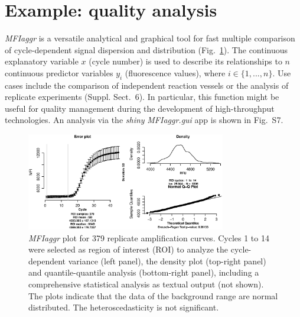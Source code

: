 \documentclass{bioinfo}
\begin{document}
\section{Example: quality analysis}

\textsl{MFIaggr} is a versatile analytical and graphical tool for fast multiple 
comparison of cycle-dependent signal dispersion and distribution 
(Fig.~\ref{fig:01}). The continuous explanatory variable $x$ (cycle number) is 
used to describe its relationships to $n$ continuous predictor variables $y_i$ 
(fluorescence values), where $i \in \{1, ..., n\}$. Use cases include the 
comparison of independent reaction vessels or the analysis of replicate 
experiments (Suppl. Sect.~6). In particular, this function might be useful for 
quality management during the development of high-throughput technologies. An 
analysis via the \emph{shiny} \textsl{MFIaggr.gui} app is shown in Fig.~S7.

\begin{figure}[!tpb]%
\centerline{\includegraphics[width=8.7cm]{fig01.eps}}
\caption{\textsl{MFIaggr} plot for 379 replicate amplification curves. Cycles 1 to 14 were 
selected as region of interest (ROI) to analyze the 
cycle-dependent variance (left panel), the density plot (top-right 
panel) and quantile-quantile analysis (bottom-right panel), including a 
comprehensive statistical analysis as textual output (not shown). The plots 
indicate that the data of the background range are normal 
distributed. The heteroscedasticity is not significant.}\label{fig:01}
\end{figure}
\end{document}
